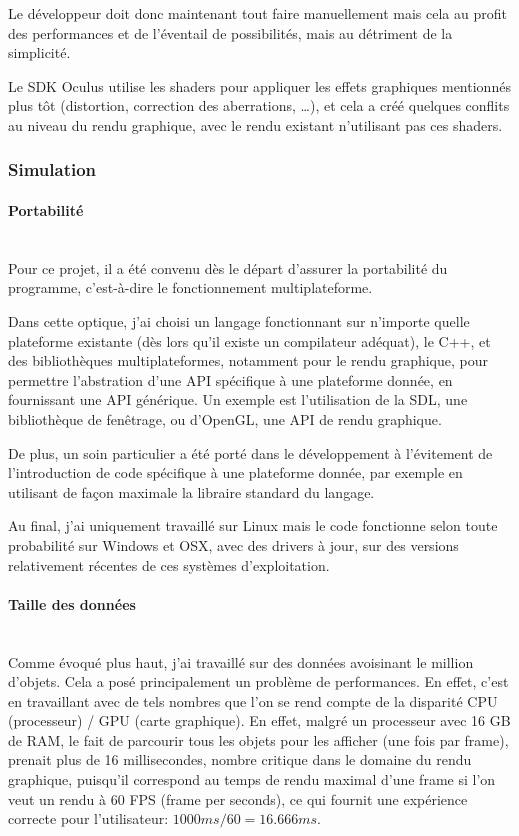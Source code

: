 \documentclass[a4paper,french,12pt]{article}
\begin{document}
		Le développeur doit donc maintenant tout faire manuellement mais cela au profit des performances et de l'éventail
		de possibilités, mais au détriment de la simplicité.
		
		Le SDK Oculus utilise les shaders pour appliquer les effets graphiques mentionnés plus tôt (distortion, 
		correction des aberrations, \ldots), et cela a créé quelques conflits au niveau du rendu graphique, 
		avec le rendu existant n'utilisant pas ces shaders.
		
	    \subsubsection{Simulation}
		\paragraph{Portabilité} ~\\
		
		
		  Pour ce projet, il a été convenu dès le départ d'assurer la portabilité du programme, c'est-à-dire
		  le fonctionnement multiplateforme.
		  
		  Dans cette optique, j'ai choisi un langage fonctionnant sur n'importe quelle plateforme existante 
		  (dès lors qu'il existe un compilateur adéquat), le C++, et
		  des bibliothèques multiplateformes, notamment pour le rendu graphique,
		  pour permettre l'abstration d'une API spécifique à une plateforme donnée, en fournissant une API générique.
		  Un exemple est l'utilisation de la SDL, une bibliothèque de fenêtrage, ou d'OpenGL, une API de rendu
		  graphique.
		  
		  De plus, un soin particulier a été porté dans le développement à  l'évitement de l'introduction 
		  de code spécifique à une plateforme donnée, par exemple en utilisant de façon maximale la libraire 
		  standard du langage.
		  
		  Au final, j'ai uniquement travaillé sur Linux mais le code fonctionne selon toute probabilité sur 
		  Windows et OSX, avec des drivers à jour, sur des versions relativement récentes de ces systèmes d'exploitation.
		  
		  
		  
		\paragraph{Taille des données} ~\\
		
		  Comme évoqué plus haut, j'ai travaillé sur des données avoisinant le million d'objets. Cela a posé
		  principalement un problème de performances. En effet, c'est en travaillant avec de tels nombres que
		  l'on se rend compte de la disparité CPU (processeur) / GPU (carte graphique).
		  En effet, malgré un processeur avec 16 GB de RAM, le fait de parcourir tous les objets pour les afficher (une fois par frame),
		  prenait plus de 16 millisecondes, nombre critique dans le domaine du rendu graphique, puisqu'il
		  correspond au temps de rendu maximal d'une frame si l'on veut un rendu à 60 FPS (frame per seconds),
		  ce qui fournit une expérience correcte pour l'utilisateur: $1000 ms / 60 = 16.666 ms$.
		  
\end{document}
